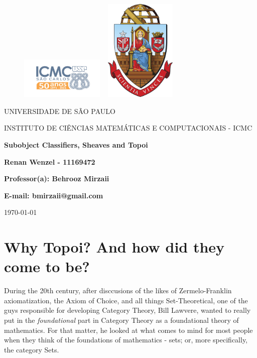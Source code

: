 \documentclass{article}
\begin{document}
\begin{figure}[ht]
	\includegraphics[width=4cm]{../icmc.png}
	\hspace{7cm}
	\includegraphics[height=4.9cm,width=4cm]{../brasao_usp_cor.jpg}
	\endminipage
\end{figure}

\begin{center}
	\vspace{1cm}
	\LARGE
	UNIVERSIDADE DE SÃO PAULO

	\vspace{1.3cm}
	\LARGE
	INSTITUTO DE CIÊNCIAS MATEMÁTICAS E COMPUTACIONAIS - ICMC

	\vspace{1.7cm}
	\Large
	\textbf{Subobject Classifiers, Sheaves and Topoi}

	\vspace{1.3cm}
	\large
	\textbf{Renan Wenzel - 11169472}

	\vspace{1.3cm}
	\large
	\textbf{Professor(a): Behrooz Mirzaii}

	\textbf{E-mail: bmirzaii@gmail.com}

	\vspace{5.3cm}
	\today
\end{center}

\newpage
\tableofcontents

\newpage
\section{Why Topoi? And how did they come to be?}
During the 20th century, after disccusions of the likes of Zermelo-Franklin axiomatization, the Axiom of Choice, and all things Set-Theoretical, one of the guys responsible for developing Category Theory, Bill Lawvere, wanted to really put in the \textit{foundational} part in Category Theory as a foundational theory of mathematics. For that matter, he looked at what comes to mind for most people when they think of the foundations of mathematics - sets; or, more specifically, the category Sets.
\end{document}
